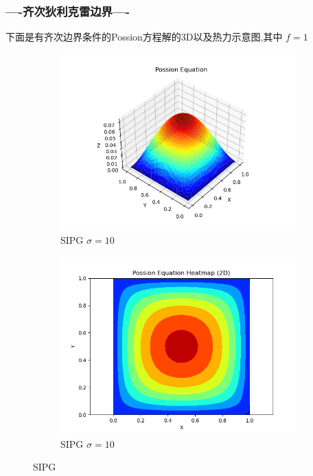 \subsubsection*{----齐次狄利克雷边界----}
下面是有齐次边界条件的Possion方程解的3D以及热力示意图,其中 $f=1$

\begin{figure}[H]
    \centering  
    \begin{subfigure}{0.5\textwidth}  
        \centering  
        \includegraphics[width=0.9\linewidth]{./pics/final/possion/2d/3Dplot_eps-1.0sig10.0_parapq30a0.01e.png}  
        \caption{SIPG $\sigma=10$}  
    \end{subfigure}%
    \begin{subfigure}{0.5\textwidth}  
        \centering  
        \includegraphics[width=0.9\linewidth]{./pics/final/possion/2d/heatmap_eps-1.0sig10.0_parapq30a0.01e.png}  
        \caption{SIPG $\sigma=10$}
    \end{subfigure}  
    \caption{SIPG}  


\end{figure}
